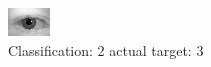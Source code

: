 \begin{figure}[h!]
\begin{center}
\includegraphics[width=0.60\columnwidth]{figures/ID545_class_2_target_3.png}
\end{center}
\caption{ Classification: 2 actual target: 3}
\label{fig:ID545_class_2_target_3}
\end{figure}
